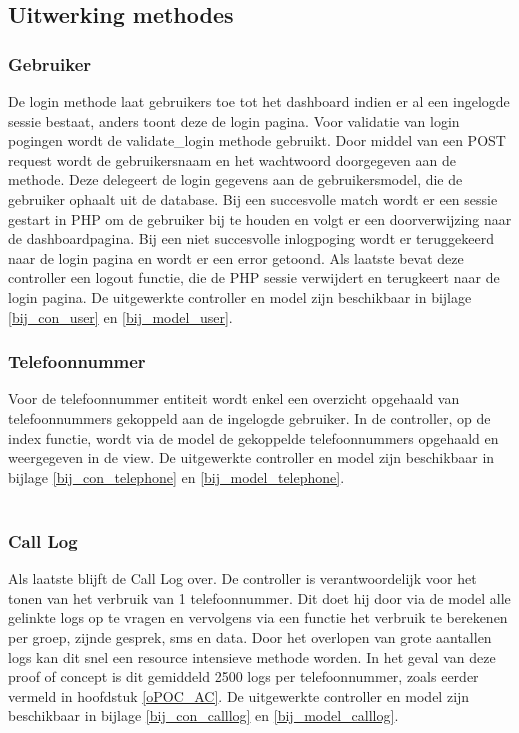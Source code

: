 \subsection{Uitwerking methodes}
\subsubsection{Gebruiker}
De login methode laat gebruikers toe tot het dashboard indien er al een ingelogde sessie bestaat, anders toont deze de login pagina. Voor validatie van login pogingen wordt de validate\_login methode gebruikt. Door middel van een POST request wordt de gebruikersnaam en het wachtwoord doorgegeven aan de methode. Deze delegeert de login gegevens aan de gebruikersmodel, die de gebruiker ophaalt uit de database. Bij een succesvolle match wordt er een sessie gestart in PHP om de gebruiker bij te houden en volgt er een doorverwijzing naar de dashboardpagina. Bij een niet succesvolle inlogpoging wordt er teruggekeerd naar de login pagina en wordt er een error getoond. Als laatste bevat deze controller een logout functie, die de PHP sessie verwijdert en terugkeert naar de login pagina. De uitgewerkte controller en model zijn beschikbaar in bijlage \ref{bij_con_user} en \ref{bij_model_user}.\\


\subsubsection{Telefoonnummer}
Voor de telefoonnummer entiteit wordt enkel een overzicht opgehaald van telefoonnummers gekoppeld aan de ingelogde gebruiker. In de controller, op de index functie, wordt via de model de gekoppelde telefoonnummers opgehaald en weergegeven in de view. De uitgewerkte controller en model zijn beschikbaar in bijlage \ref{bij_con_telephone} en \ref{bij_model_telephone}.\\\\


\subsubsection{Call Log}
Als laatste blijft de Call Log over. De controller is verantwoordelijk voor het tonen van het verbruik van 1 telefoonnummer. Dit doet hij door via de model alle gelinkte logs op te vragen en vervolgens via een functie het verbruik te berekenen per groep, zijnde gesprek, sms en data. Door het overlopen van grote aantallen logs kan dit snel een resource intensieve methode worden. In het geval van deze proof of concept is dit gemiddeld 2500 logs per telefoonnummer, zoals eerder vermeld in hoofdstuk \ref{oPOC_AC}. De uitgewerkte controller en model zijn beschikbaar in bijlage \ref{bij_con_calllog} en \ref{bij_model_calllog}.\\


